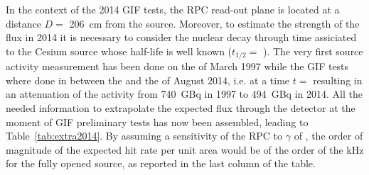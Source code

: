 	In the context of the 2014 GIF tests, the RPC read-out plane is located at a distance $D=$ \SI{206}{cm} from the source. Moreover, to estimate the strength of the flux in 2014 it is necessary to consider the nuclear decay through time assiciated to the Cesium source whose half-life is well known ($t_{1/2}=$ ). The very first source activity measurement has been done on the  of March 1997 while the GIF tests where done in between the  and the  of August 2014, i.e. at a time $t=$  resulting in an attenuation of the activity from \SI{740}{GBq} in 1997 to \SI{494}{GBq} in 2014. All the needed information to extrapolate the expected flux through the detector at the moment of GIF preliminary tests has now been assembled, leading to Table~\ref{tab:extra2014}. By assuming a sensitivity of the RPC to $\gamma$ of , the order of magnitude of the expected hit rate per unit area would be of the order of the \si{kHz} for the fully opened source, as reported in the last column of the table.
	
